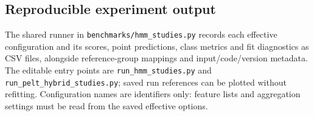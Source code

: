 \subsection{Reproducible experiment output}
\label{subsec:seg-reproducibility}
The shared runner in \texttt{benchmarks/\allowbreak{}hmm\_\allowbreak{}studies.py} records each effective configuration and its scores, point predictions, class metrics and fit diagnostics as CSV files, alongside reference-group mappings and input/code/version metadata.
The editable entry points are \texttt{run\_\allowbreak{}hmm\_\allowbreak{}studies.py} and \texttt{run\_\allowbreak{}pelt\_\allowbreak{}hybrid\_\allowbreak{}studies.py}; saved run references can be plotted without refitting.
Configuration names are identifiers only: feature lists and aggregation settings must be read from the saved effective options.


